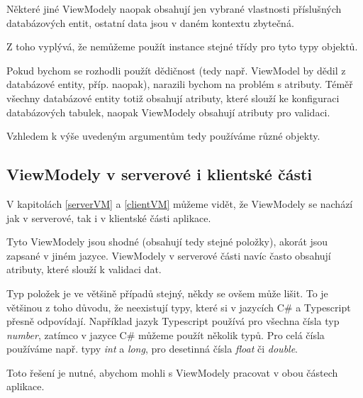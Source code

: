 Některé jiné ViewModely naopak obsahují jen vybrané vlastnosti příslušných databázových entit, ostatní data jsou v daném kontextu zbytečná.

Z toho vyplývá, že nemůžeme použít instance stejné třídy pro tyto typy objektů.

Pokud bychom se rozhodli použít dědičnost (tedy např. ViewModel by dědil z databázové entity, příp. naopak), narazili bychom na problém s atributy.
Téměř všechny databázové entity totiž obsahují atributy, které slouží ke konfiguraci databázových tabulek, naopak ViewModely obsahují atributy pro validaci. 

Vzhledem k výše uvedeným argumentům tedy používáme různé objekty.


\subsection{ViewModely v serverové i klientské části}

V kapitolách \ref{serverVM} a \ref{clientVM} můžeme vidět, že ViewModely se nachází jak v serverové, tak i v klientské části aplikace. 

Tyto ViewModely jsou shodné (obsahují tedy stejné položky), akorát jsou zapsané v jiném jazyce. ViewModely v serverové části navíc často obsahují atributy, které slouží k validaci dat.

Typ položek je ve většině případů stejný, někdy se ovšem může lišit. To je většinou z toho důvodu, že neexistují typy, které si v jazycích C\# a Typescript přesně odpovídají.
Například jazyk Typescript používá pro všechna čísla typ \textit{number}, zatímco v jazyce C\# můžeme použít několik typů. 
Pro celá čísla používáme např. typy \textit{int} a \textit{long}, pro desetinná čísla \textit{float} či \textit{double}.

Toto řešení je nutné, abychom mohli s ViewModely pracovat v obou částech aplikace.